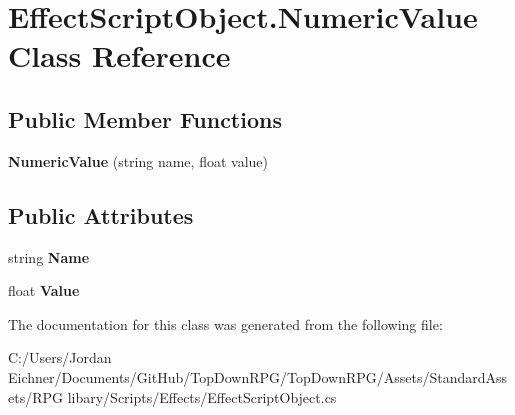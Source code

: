 \hypertarget{class_effect_script_object_1_1_numeric_value}{}\section{Effect\+Script\+Object.\+Numeric\+Value Class Reference}
\label{class_effect_script_object_1_1_numeric_value}
\subsection*{Public Member Functions}
\begin{DoxyCompactItemize}
\item 
\hypertarget{class_effect_script_object_1_1_numeric_value_a16eae89225efd79f25f35d27537fd2c8}{}{\bfseries Numeric\+Value} (string name, float value)\label{class_effect_script_object_1_1_numeric_value_a16eae89225efd79f25f35d27537fd2c8}

\end{DoxyCompactItemize}
\subsection*{Public Attributes}
\begin{DoxyCompactItemize}
\item 
\hypertarget{class_effect_script_object_1_1_numeric_value_a999741e2fc10ebbcc4b09c0c396aebd3}{}string {\bfseries Name}\label{class_effect_script_object_1_1_numeric_value_a999741e2fc10ebbcc4b09c0c396aebd3}

\item 
\hypertarget{class_effect_script_object_1_1_numeric_value_a22b9e6b3ab3b960e7c9f2db374e77a30}{}float {\bfseries Value}\label{class_effect_script_object_1_1_numeric_value_a22b9e6b3ab3b960e7c9f2db374e77a30}

\end{DoxyCompactItemize}


The documentation for this class was generated from the following file\+:\begin{DoxyCompactItemize}
\item 
C\+:/\+Users/\+Jordan Eichner/\+Documents/\+Git\+Hub/\+Top\+Down\+R\+P\+G/\+Top\+Down\+R\+P\+G/\+Assets/\+Standard\+Assets/\+R\+P\+G libary/\+Scripts/\+Effects/Effect\+Script\+Object.\+cs\end{DoxyCompactItemize}
